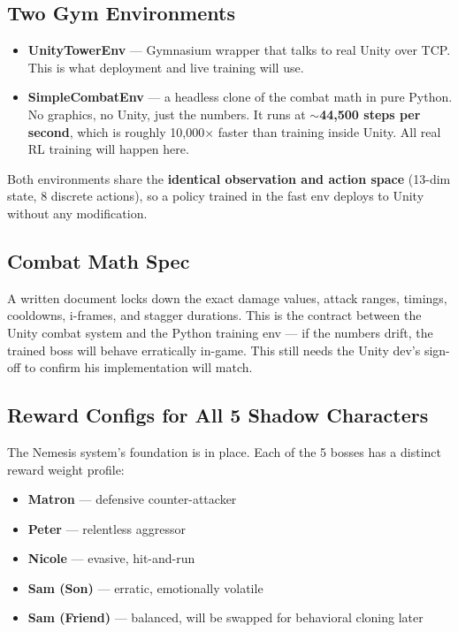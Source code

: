 \documentclass[11pt]{article}
\begin{document}
\subsection*{Two Gym Environments}
\begin{itemize}[leftmargin=*]
    \item \textbf{UnityTowerEnv} --- Gymnasium wrapper that talks to real Unity over TCP. This is what deployment and live training will use.
    \item \textbf{SimpleCombatEnv} --- a headless clone of the combat math in pure Python. No graphics, no Unity, just the numbers. It runs at \textbf{$\sim$44{,}500 steps per second}, which is roughly 10{,}000$\times$ faster than training inside Unity. All real RL training will happen here.
\end{itemize}

Both environments share the \textbf{identical observation and action space} (13-dim state, 8 discrete actions), so a policy trained in the fast env deploys to Unity without any modification.

\subsection*{Combat Math Spec}
A written document locks down the exact damage values, attack ranges, timings, cooldowns, i-frames, and stagger durations. This is the contract between the Unity combat system and the Python training env --- if the numbers drift, the trained boss will behave erratically in-game. This still needs the Unity dev's sign-off to confirm his implementation will match.

\subsection*{Reward Configs for All 5 Shadow Characters}
The Nemesis system's foundation is in place. Each of the 5 bosses has a distinct reward weight profile:
\begin{itemize}[leftmargin=*]
    \item \textbf{Matron} --- defensive counter-attacker
    \item \textbf{Peter} --- relentless aggressor
    \item \textbf{Nicole} --- evasive, hit-and-run
    \item \textbf{Sam (Son)} --- erratic, emotionally volatile
    \item \textbf{Sam (Friend)} --- balanced, will be swapped for behavioral cloning later
\end{itemize}
\end{document}
